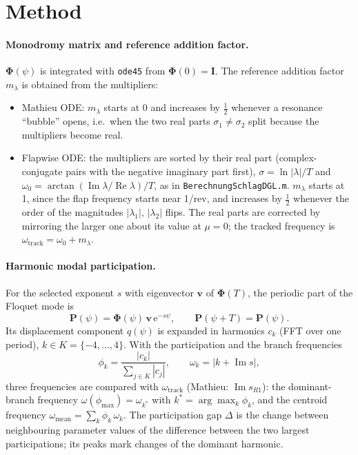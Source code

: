 \documentclass[11pt,a4paper]{article}
\newcommand{\Rea}{\operatorname{Re}}
\newcommand{\Ima}{\operatorname{Im}}
\begin{document}
\section{Method}

\paragraph{Monodromy matrix and reference addition factor.}
$\bm{\Phi}(\psi)$ is integrated with \texttt{ode45} from $\bm{\Phi}(0) = \bm{I}$. The
reference addition factor $m_\lambda$ is obtained from the multipliers:
\begin{itemize}
  \item Mathieu ODE: $m_\lambda$ starts at 0 and increases by $\tfrac{1}{2}$ whenever a
        resonance ``bubble'' opens, i.e.\ when the two real parts $\sigma_1 \neq \sigma_2$
        split because the multipliers become real.
  \item Flapwise ODE: the multipliers are sorted by their real part (complex-conjugate
        pairs with the negative imaginary part first),
        $\sigma = \ln|\lambda|/T$ and $\omega_0 = \arctan(\Ima\lambda/\Rea\lambda)/T$, as in
        \texttt{BerechnungSchlagDGL.m}. $m_\lambda$ starts at 1, since the flap frequency
        starts near 1/rev, and increases by $\tfrac{1}{2}$ whenever the order of the
        magnitudes $|\lambda_1|$, $|\lambda_2|$ flips. The real parts are corrected by
        mirroring the larger one about its value at $\mu = 0$; the tracked frequency is
        $\omega_\text{track} = \omega_0 + m_\lambda$.
\end{itemize}

\paragraph{Harmonic modal participation.}
For the selected exponent $s$ with eigenvector $\bm{v}$ of $\bm{\Phi}(T)$, the periodic
part of the Floquet mode is
\begin{equation}
  \bm{P}(\psi) = \bm{\Phi}(\psi)\,\bm{v}\,\mathrm{e}^{-s\psi}, \qquad \bm{P}(\psi + T) = \bm{P}(\psi).
\end{equation}
Its displacement component $q(\psi)$ is expanded in harmonics $c_k$ (FFT over one period),
$k \in K = \{-4, \dots, 4\}$. With the participation and the branch frequencies
\begin{equation}
  \phi_k = \frac{|c_k|}{\sum_{j\in K}|c_j|}, \qquad \omega_k = |k + \Ima s| ,
\end{equation}
three frequencies are compared with $\omega_\text{track}$ (Mathieu: $\Ima s_{R1}$):
the dominant-branch frequency $\omega(\phi_\text{max}) = \omega_{k^*}$ with
$k^* = \arg\max_k \phi_k$, and the centroid frequency
$\omega_\text{mean} = \sum_{k} \phi_k\,\omega_k$. The participation gap $\Delta$ is the
change between neighbouring parameter values of the difference between the two largest
participations; its peaks mark changes of the dominant harmonic.
\end{document}
